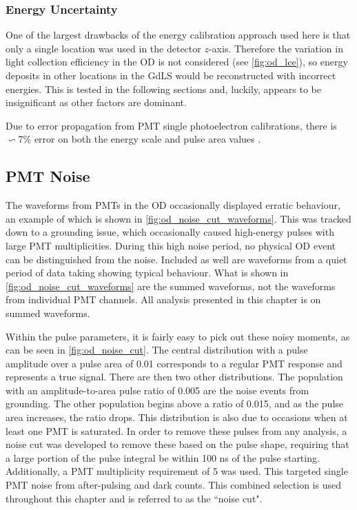 \subsubsection{Energy Uncertainty}
\par
One of the largest drawbacks of the energy calibration approach used here is that only a single location was used in the detector $z$-axis.
Therefore the variation in light collection efficiency in the OD is not considered (see \autoref{fig:od_lce}), so energy deposits in other locations in the GdLS would be reconstructed with incorrect energies.
This is tested in the following sections and, luckily, appears to be insignificant as other factors are dominant.
\par
Due to error propagation from PMT single photoelectron calibrations, there is $\backsim$7\% error on both the energy scale and pulse area values \cite{ewanfraser_thesis_ref}.


\subsection{PMT Noise}
\par
The waveforms from PMTs in the OD occasionally displayed erratic behaviour, an example of which is shown in \autoref{fig:od_noise_cut_waveforms}.
This was tracked down to a grounding issue, which occasionally caused high-energy pulses with large PMT multiplicities.
During this high noise period, no physical OD event can be distinguished from the noise.
Included as well are waveforms from a quiet period of data taking showing typical behaviour.
What is shown in \autoref{fig:od_noise_cut_waveforms} are the summed waveforms, not the waveforms from individual PMT channels.
All analysis presented in this chapter is on summed waveforms.

\par
Within the pulse parameters, it is fairly easy to pick out these noisy moments, as can be seen in \autoref{fig:od_noise_cut}.
The central distribution with a pulse amplitude over a pulse area of 0.01 corresponds to a regular PMT response and represents a true signal.
There are then two other distributions.
The population with an amplitude-to-area pulse ratio of 0.005 are the noise events from grounding.
The other population begins above a ratio of 0.015, and as the pulse area increases, the ratio drops.
This distribution is also due to occasions when at least one PMT is saturated.
In order to remove these pulses from any analysis, a noise cut was developed to remove these based on the pulse shape, requiring that a large portion of the pulse integral be within 100 ns of the pulse starting.
Additionally, a PMT multiplicity requirement of 5 was used.
This targeted single PMT noise from after-pulsing and dark counts.
This combined selection is used throughout this chapter and is referred to as the ``noise cut".


